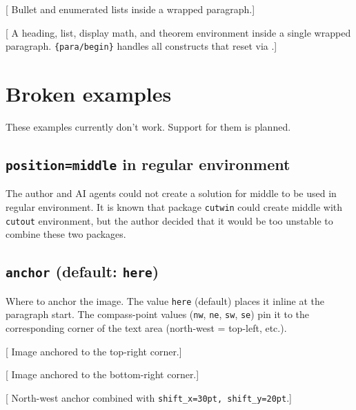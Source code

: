 \documentclass{article}
\begin{document}
[
  Bullet and enumerated lists inside a wrapped paragraph.]

[
  A heading, list, display math, and theorem environment inside a single
  wrapped paragraph.  \texttt{\string\AddToHook\{para/begin\}} handles
  all constructs that reset \texttt{\string\everypar} via
  \texttt{\string\@afterheading}.]

\section{Broken examples}

These examples currently don't work.  Support for them is planned.

\subsection{\texttt{position=middle} in regular environment}\label{problem:position-middle}

The author and AI agents could not create a solution for middle to be
used in regular environment. It is known that  package \texttt{cutwin} could
create middle with \texttt{cutout} environment, but the author
decided that it would be too unstable to combine these two packages.


\subsection{\texttt{anchor} (default: \texttt{here})}\label{macro:anchor}\label{problem:anchor}

Where to anchor the image.  The value \texttt{here} (default) places it
inline at the paragraph start.  The compass-point values
(\texttt{nw}, \texttt{ne}, \texttt{sw}, \texttt{se}) pin it to the
corresponding corner of the text area (north-west = top-left, etc.).


[
  Image anchored to the top-right corner.]

[
  Image anchored to the bottom-right corner.]

[
  North-west anchor combined with \texttt{shift\_x=30pt, shift\_y=20pt}.]
\end{document}
